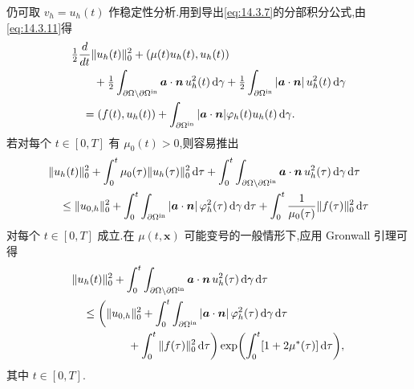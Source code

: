 仍可取 \(v_h=u_h(t)\) 作稳定性分析.用到导出\eqref{eq:14.3.7}的分部积分公式,由\eqref{eq:14.3.11}得
\[
  \begin{aligned}
    &\tfrac12\frac{d}{dt}\|u_h(t)\|_0^2+(\mu(t)u_h(t),u_h(t))\\
    &\qquad+\tfrac12\int_{\partial\Omega\setminus\partial\Omega^{\rm in}}
                  \boldsymbol{a}\cdot\boldsymbol{n}\,u_h^2(t)\,\mathrm d\gamma
       +\tfrac12\int_{\partial\Omega^{\rm in}}
                  |\boldsymbol{a}\cdot\boldsymbol{n}|\,u_h^2(t)\,\mathrm d\gamma\\
    &\quad=(f(t),u_h(t))
        +\int_{\partial\Omega^{\rm in}}|\boldsymbol{a}\cdot\boldsymbol{n}|
                 \varphi_h(t)u_h(t)\,\mathrm d\gamma.
  \end{aligned}
\]
若对每个 \(t\in[0,T]\) 有 \(\mu_0(t)>0\),则容易推出
\begin{equation}\label{eq:14.3.12}
  \begin{aligned}
    &\|u_h(t)\|_0^2+\int_0^t\mu_0(\tau)\|u_h(\tau)\|_0^2\,\mathrm d\tau
        +\int_0^t\int_{\partial\Omega\setminus\partial\Omega^{\rm in}}
            \boldsymbol{a}\cdot\boldsymbol{n}\,u_h^2(\tau)\,\mathrm d\gamma\,\mathrm d\tau\\
    &\quad\le\|u_{0,h}\|_0^2+\int_0^t\int_{\partial\Omega^{\rm in}}
             |\boldsymbol{a}\cdot\boldsymbol{n}|\,\varphi_h^2(\tau)\,\mathrm d\gamma\,\mathrm d\tau
        +\int_0^t\frac1{\mu_0(\tau)}\|f(\tau)\|_0^2\,\mathrm d\tau
  \end{aligned}
\end{equation}
对每个 \(t\in[0,T]\) 成立.在 \(\mu(t,\boldsymbol{x})\) 可能变号的一般情形下,应用 Gronwall 引理可得
\begin{equation}\label{eq:14.3.13}
  \begin{aligned}
    &\|u_h(t)\|_0^2+\int_0^t\int_{\partial\Omega\setminus\partial\Omega^{\rm in}}
             \boldsymbol{a}\cdot\boldsymbol{n}\,u_h^2(\tau)\,\mathrm d\gamma\,\mathrm d\tau\\
    &\quad\le\biggl(\|u_{0,h}\|_0^2+\int_0^t\int_{\partial\Omega^{\rm in}}
              |\boldsymbol{a}\cdot\boldsymbol{n}|\,\varphi_h^2(\tau)\,\mathrm d\gamma\,\mathrm d\tau\\
    &\hspace{5em}+\int_0^t\|f(\tau)\|_0^2\,\mathrm d\tau\biggr)
               \exp\biggl(\int_0^t[1+2\mu^*(\tau)]\,\mathrm d\tau\biggr),
  \end{aligned}
\end{equation}
其中 \(t\in[0,T]\).

